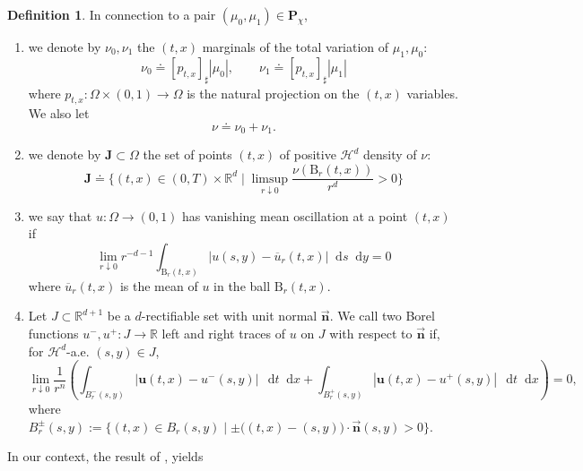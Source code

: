 \documentclass[11pt, twoside, reqno]{amsart}
\theoremstyle{definition}
\newtheorem{defi}[thm]{Definition}
\theoremstyle{remark}
\numberwithin{equation}{section}
\newcommand*\dif{\mathop{}\!\mathrm{d}}
\newcommand{\mr}[1]{\mathrm{#1}}
\newcommand{\bs}[1]{\boldsymbol{#1}}
\newcommand{\msc}[1]{\mathscr{#1}}
\newcommand{\ol}[1]{\overline{#1}}
\begin{document}
\begin{defi}\label{defi:projset}
In connection to a pair $(\mu_0, \mu_1) \in \mathbf P_{\chi}$,
\begin{enumerate}
    \item we denote by $\nu_0, \nu_1$ the $(t, x)$ marginals of the total variation of $\mu_1, \mu_0$:
\begin{equation}\label{eq:projmeas}
    \nu_0 \doteq [p_{t, x}]_{\sharp} | \mu_0| , \qquad \nu_1 \doteq  [p_{t, x}]_{\sharp} |\mu_1|
\end{equation}
where $p_{t, x} : \Omega\times (0,1)\to \Omega$ is the natural projection on the $(t, x)$ variables. We also let $$\nu \doteq \nu_0 + \nu_1.$$

\item we denote by  $\mathbf J \subset \Omega$ the set of points $(t, x)$ of positive $\msc H^{d}$ density of $\nu$:
\begin{equation}\label{eq:setJ}
    \mathbf  J \doteq \Bigg\{(t, x) \in (0, T) \times \mathbb R^d \; \Big| \; \limsup_{r \downarrow 0} \frac{\nu\left(\mr B_r(t,x)\right)}{r^{d}} > 0\Bigg\}
\end{equation}

\item we say that $u: \Omega \to (0, 1)$ has vanishing mean oscillation at a point $(t, x)$ if 
\begin{equation}
    \lim_{r \downarrow 0} r^{-d-1}\int_{\mr B_r\left(t, x\right)} |u(s, y) - \ol u_r(t, x)| \dif s \dif y = 0
\end{equation}
where $\ol u_r(t, x)$ is the mean of $u$ in the ball $\mr B_r(t,x)$.
\item  Let $J \subset \mathbb{R}^{d+1}$ be a $d$-rectifiable set with unit normal $\vec{\bs{  n}}$. We call two Borel functions $u^-, u^+ : J \to \mathbb{R}$ left and right traces of $u$ on $J$ with respect to $\vec{\bs{  n}}$ if, for $\msc{H}^{d}$-a.e. $(s,y) \in J$,
$$
\lim_{r \downarrow 0} \frac{1}{r^n} \left( \int_{B^-_r(s,y)} |\bs u(t,x) - u^-(s,y)| \, \dif  t\dif x + \int_{B^+_r(s,y)} |\bs u(t,x) - u^+(s,y)| \,  \dif  t\dif x \right) = 0,
$$
where $B^\pm_r(s,y) := \{ (t,x) \in B_r(s,y) \mid \pm \big((t,x)-(s,y) \big) \cdot\vec{\bs{  n}}(s,y) > 0 \}$.
\end{enumerate}
\end{defi}
In our context, the result of \cite{DOW03}, yields
\end{document}
